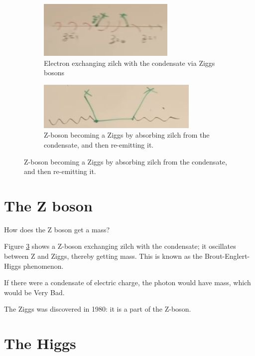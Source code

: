 \documentclass[]{article}
\begin{document}
\begin{figure}[H]
	\caption{Spontaneous breaking of chiral symmetry}
	\begin{subfigure}[t]{0.4\textwidth}
		\caption{Electron exchanging zilch with the condensate via Ziggs bosons}\label{fig:2-a3-zilch}
		\includegraphics[width=\textwidth]{2-a3-zilch}
	\end{subfigure}
	\begin{subfigure}[t]{0.4\textwidth}
		\caption{Z-boson becoming a Ziggs by absorbing zilch from the condensate, and then re-emitting it.}\label{fig:2-a3-zilch-Z}
		\includegraphics[width=\textwidth]{2-a3-zilch-Z}
	\end{subfigure}
\end{figure}

\section{The Z boson}

How does the Z boson get a mass?

Figure \ref{fig:2-a3-zilch-Z} shows a Z-boson exchanging zilch with the condensate; it oscillates between Z and Ziggs, thereby getting mass. This is known as the Brout-Englert-Higgs phenomenon.

If there were a condensate of electric charge, the photon would have mass, which would be Very Bad.

The Ziggs was discovered in 1980: it is a part of the Z-boson.

\section{The Higgs}
\end{document}
